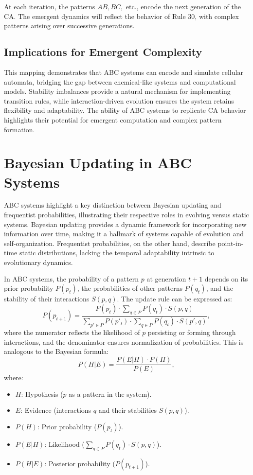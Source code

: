 \documentclass[entropy,article,submit,pdftex,moreauthors]{Definitions/mdpi}
\begin{document}
At each iteration, the patterns \( AB, BC, \) etc., encode the next generation of the CA. The emergent dynamics will reflect the behavior of Rule 30, with complex patterns arising over successive generations.

\subsection{Implications for Emergent Complexity}

This mapping demonstrates that ABC systems can encode and simulate cellular automata, bridging the gap between chemical-like systems and computational models. Stability imbalances provide a natural mechanism for implementing transition rules, while interaction-driven evolution ensures the system retains flexibility and adaptability. The ability of ABC systems to replicate CA behavior highlights their potential for emergent computation and complex pattern formation.

\section{Bayesian Updating in ABC Systems}

ABC systems highlight a key distinction between Bayesian updating and frequentist probabilities, illustrating their respective roles in evolving versus static systems. Bayesian updating provides a dynamic framework for incorporating new information over time, making it a hallmark of systems capable of evolution and self-organization. Frequentist probabilities, on the other hand, describe point-in-time static distributions, lacking the temporal adaptability intrinsic to evolutionary dynamics.

In ABC systems, the probability of a pattern \( p \) at generation \( t+1 \) depends on its prior probability \( P(p_t) \), the probabilities of other patterns \( P(q_t) \), and the stability of their interactions \( S(p, q) \). The update rule can be expressed as:
\[
P(p_{t+1}) = \frac{P(p_t) \cdot \sum_{q \in P} P(q_t) \cdot S(p, q)}{\sum_{p' \in P} P(p'_t) \cdot \sum_{q \in P} P(q_t) \cdot S(p', q)},
\]
where the numerator reflects the likelihood of \( p \) persisting or forming through interactions, and the denominator ensures normalization of probabilities. This is analogous to the Bayesian formula:
\[
P(H|E) = \frac{P(E|H) \cdot P(H)}{P(E)},
\]
where:
\begin{itemize}
    \item \( H \): Hypothesis (\( p \) as a pattern in the system).
    \item \( E \): Evidence (interactions \( q \) and their stabilities \( S(p, q) \)).
    \item \( P(H) \): Prior probability (\( P(p_t) \)).
    \item \( P(E|H) \): Likelihood (\( \sum_{q \in P} P(q_t) \cdot S(p, q) \)).
    \item \( P(H|E) \): Posterior probability (\( P(p_{t+1}) \)).
\end{itemize}
\end{document}
